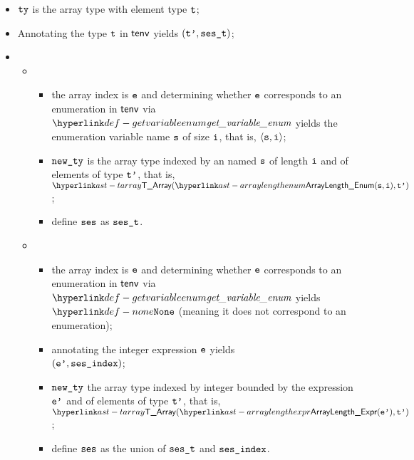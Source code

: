 \ProseParagraph
\AllApply
\begin{itemize}
  \item $\tty$ is the array type with element type $\vt$;
  \item Annotating the type $\vt$ in $\tenv$ yields $(\vtp, \vsest)$\ProseOrTypeError;
  \item \OneApplies
  \begin{itemize}
    \item {}
    \begin{itemize}
      \item the array index is $\ve$ and determining whether $\ve$ corresponds to an enumeration in $\tenv$
      via $\getvariableenum$ yields the enumeration variable
      name $\vs$ of size $\vi$, that is, $\langle \vs, \vi \rangle$\ProseOrTypeError;
      \item $\newty$ is the array type indexed by an \enumerationtypeterm{}
      named $\vs$ of length $\vi$ and of elements of type $\vtp$, that is, $\TArray(\ArrayLengthEnum(\vs, \vi), \vtp)$;
      \item define $\vses$ as $\vsest$.
    \end{itemize}

    \item {}
    \begin{itemize}
      \item the array index is $\ve$ and determining whether $\ve$ corresponds to an enumeration in $\tenv$
      via $\getvariableenum$ yields $\None$ (meaning it does not
      correspond to an enumeration)\ProseOrTypeError;
      \item annotating the \symbolicallyevaluable{} integer expression $\ve$ yields\\
      $(\vep, \vsesindex)$\ProseOrTypeError;
      \item $\newty$ the array type indexed by integer bounded by
      the expression $\vep$ and of elements of type $\vtp$, that is,
      $\TArray(\ArrayLengthExpr(\vep), \vtp)$;
      \item define $\vses$ as the union of $\vsest$ and $\vsesindex$.
    \end{itemize}
  \end{itemize}
\end{itemize}

\FormallyParagraph
\begin{mathpar}
\end{mathpar}

